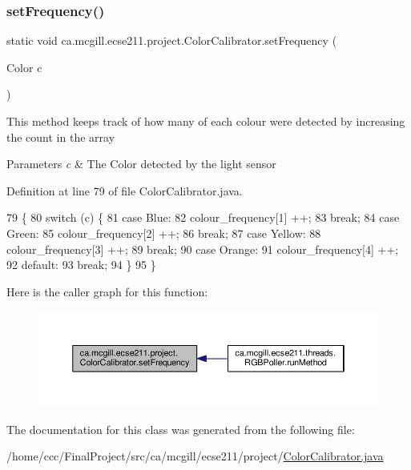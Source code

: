 \subsubsection{\texorpdfstring{set\+Frequency()}{setFrequency()}}
{\footnotesize\ttfamily static void ca.\+mcgill.\+ecse211.\+project.\+Color\+Calibrator.\+set\+Frequency (\begin{DoxyParamCaption}\item[{Color}]{c }\end{DoxyParamCaption})\hspace{0.3cm}{\ttfamily [static]}}

This method keeps track of how many of each colour were detected by increasing the count in the array 
\begin{DoxyParams}{Parameters}
{\em c} & The Color detected by the light sensor \\
\hline
\end{DoxyParams}


Definition at line 79 of file Color\+Calibrator.\+java.


\begin{DoxyCode}
79                                            \{
80     \textcolor{keywordflow}{switch} (c) \{
81       \textcolor{keywordflow}{case} Blue:
82         colour\_frequency[1] ++;
83         \textcolor{keywordflow}{break};
84       \textcolor{keywordflow}{case} Green:
85         colour\_frequency[2] ++;
86         \textcolor{keywordflow}{break};
87       \textcolor{keywordflow}{case} Yellow:
88         colour\_frequency[3] ++;
89         \textcolor{keywordflow}{break};
90       \textcolor{keywordflow}{case} Orange:
91         colour\_frequency[4] ++;
92       \textcolor{keywordflow}{default}:
93         \textcolor{keywordflow}{break};
94     \}
95   \}
\end{DoxyCode}
Here is the caller graph for this function\+:
\nopagebreak
\begin{figure}[H]
\begin{center}
\leavevmode
\includegraphics[width=350pt]{classca_1_1mcgill_1_1ecse211_1_1project_1_1_color_calibrator_a40906193773ead0bfd582f188413c97a_icgraph}
\end{center}
\end{figure}


The documentation for this class was generated from the following file\+:\begin{DoxyCompactItemize}
\item 
/home/ccc/\+Final\+Project/src/ca/mcgill/ecse211/project/\hyperlink{_color_calibrator_8java}{Color\+Calibrator.\+java}\end{DoxyCompactItemize}

